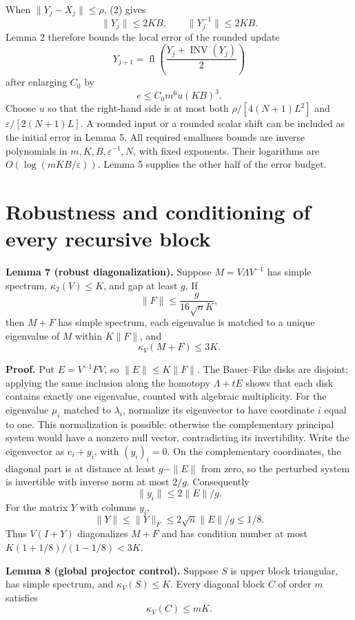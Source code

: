 \documentclass[10pt,a4paper]{article}
\begin{document}
When \(\|Y_j-X_j\|\le\rho\), (2) gives \[
 \|Y_j\|\le2KB,
 \qquad \|Y_j^{-1}\|\le2KB.
\] Lemma 2 therefore bounds the local error of the rounded update \[
 Y_{j+1}=\operatorname{fl}\!\left(\frac{Y_j+\operatorname{INV}(Y_j)}2\right)
\] after enlarging \(C_0\) by \[
 e\le C_0m^6u(KB)^3.
 \tag{10}
\] Choose \(u\) so that the right-hand side is at most both
\(\rho/[4(N+1)L^2]\) and \(\varepsilon/[2(N+1)L]\). A rounded input or a
rounded scalar shift can be included as the initial error in Lemma 5.
All required smallness bounds are inverse polynomials in
\(m,K,B,\varepsilon^{-1},N\), with fixed exponents. Their logarithms are
\(O(\log(mKB/\varepsilon))\). Lemma 5 supplies the other half of the
error budget.

\section{Robustness and conditioning of every recursive
block}\label{robustness-and-conditioning-of-every-recursive-block}

\textbf{Lemma 7 (robust diagonalization).} Suppose \(M=V\Lambda V^{-1}\)
has simple spectrum, \(\kappa_2(V)\le K\), and gap at least \(g\). If \[
 \|F\|\le\frac{g}{16\sqrt n K},
\] then \(M+F\) has simple spectrum, each eigenvalue is matched to a
unique eigenvalue of \(M\) within \(K\|F\|\), and \[
 \kappa_V(M+F)\le3K.
 \tag{11}
\]

\textbf{Proof.} Put \(E=V^{-1}FV\), so \(\|E\|\le K\|F\|\). The
Bauer--Fike disks are disjoint; applying the same inclusion along the
homotopy \(\Lambda+tE\) shows that each disk contains exactly one
eigenvalue, counted with algebraic multiplicity. For the eigenvalue
\(\mu_i\) matched to \(\lambda_i\), normalize its eigenvector to have
coordinate \(i\) equal to one. This normalization is possible: otherwise
the complementary principal system would have a nonzero null vector,
contradicting its invertibility. Write the eigenvector as \(e_i+y_i\),
with \((y_i)_i=0\). On the complementary coordinates, the diagonal part
is at distance at least \(g-\|E\|\) from zero, so the perturbed system
is invertible with inverse norm at most \(2/g\). Consequently \[
 \|y_i\|\le2\|E\|/g.
\] For the matrix \(Y\) with columns \(y_i\), \[
 \|Y\|\le\|Y\|_F\le2\sqrt n\|E\|/g\le1/8.
\] Thus \(V(I+Y)\) diagonalizes \(M+F\) and has condition number at most
\(K(1+1/8)/(1-1/8)<3K\).

\textbf{Lemma 8 (global projector control).} Suppose \(S\) is upper
block triangular, has simple spectrum, and \(\kappa_V(S)\le K\). Every
diagonal block \(C\) of order \(m\) satisfies \[
 \kappa_V(C)\le mK.
 \tag{12}
\]
\end{document}
